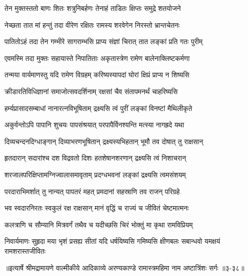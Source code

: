 \twolineshloka
{तेन मुक्तस्ततो बाणः शितः शत्रुनिबर्हणः}
{तेनाहं ताडितः क्षिप्तः समुद्रे शतयोजने} %

\twolineshloka
{नेच्छता तात मां हन्तुं तदा वीरेण रक्षितः}
{रामस्य शरवेगेन निरस्तो भ्रान्तचेतनः} %

\twolineshloka
{पातितोऽहं तदा तेन गम्भीरे सागराम्भसि}
{प्राप्य संज्ञां चिरात् तात लङ्कां प्रति गतः पुरीम्} %

\twolineshloka
{एवमस्मि तदा मुक्तः सहायास्ते निपातिताः}
{अकृतास्त्रेण रामेण बालेनाक्लिष्टकर्मणा} %

\twolineshloka
{तन्मया वार्यमाणस्तु यदि रामेण विग्रहम्}
{करिष्यस्यापदां घोरां क्षिप्रं प्राप्य न शिष्यसि} %

\twolineshloka
{क्रीडारतिविधिज्ञानां समाजोत्सवदर्शिनाम्}
{रक्षसां चैव संतापमनर्थं चाहरिष्यसि} %

\twolineshloka
{हर्म्यप्रासादसम्बाधां नानारत्नविभूषिताम्}
{द्रक्ष्यसि त्वं पुरीं लङ्कां विनष्टां मैथिलीकृते} %

\twolineshloka
{अकुर्वन्तोऽपि पापानि शुचयः पापसंश्रयात्}
{परपापैर्विनश्यन्ति मत्स्या नागह्रदे यथा} %

\twolineshloka
{दिव्यचन्दनदिग्धाङ्गान् दिव्याभरणभूषितान्}
{द्रक्ष्यस्यभिहतान् भूमौ तव दोषात् तु राक्षसान्} %

\twolineshloka
{हृतदारान् सदारांश्च दश विद्रवतो दिशः}
{हतशेषानशरणान् द्रक्ष्यसि त्वं निशाचरान्} %

\twolineshloka
{शरजालपरिक्षिप्तामग्निज्वालासमावृताम्}
{प्रदग्धभवनां लङ्कां द्रक्ष्यसि त्वमसंशयम्} %

\twolineshloka
{परदाराभिमर्शात् तु नान्यत् पापतरं महत्}
{प्रमदानां सहस्राणि तव राजन् परिग्रहे} %

\twolineshloka
{भव स्वदारनिरतः स्वकुलं रक्ष राक्षसान्}
{मानं वृद्धिं च राज्यं च जीवितं चेष्टमात्मनः} %

\twolineshloka
{कलत्राणि च सौम्यानि मित्रवर्गं तथैव च}
{यदीच्छसि चिरं भोक्तुं मा कृथा रामविप्रियम्} %

\twolineshloka
{निवार्यमाणः सुहृदा मया भृशं प्रसह्य सीतां यदि धर्षयिष्यसि}
{गमिष्यसि क्षीणबलः सबान्धवो यमक्षयं रामशरास्तजीवितः} %


॥इत्यार्षे श्रीमद्रामायणे वाल्मीकीये आदिकाव्ये अरण्यकाण्डे रामास्त्रमहिमा नाम अष्टात्रिंशः सर्गः ॥३-३८॥
